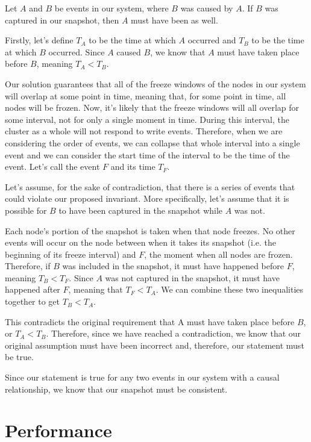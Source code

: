 Let $A$ and $B$ be events in our system, where $B$ was caused by
$A$. If $B$ was captured in our snapshot, then $A$ must have been as
well.

Firstly, let’s define $T_A$ to be the time at which $A$ occurred and
$T_B$ to be the time at which $B$ occurred. Since $A$ caused $B$, we know
that $A$ must have taken place before $B$, meaning $T_A < T_B$.

Our solution guarantees that all of the freeze windows of the nodes in
our system will overlap at some point in time, meaning that, for some
point in time, all nodes will be frozen. Now, it’s likely that the
freeze windows will all overlap for some interval, not for only a
single moment in time. During this interval, the cluster as a whole will not
respond to write events. Therefore, when we are considering the order
of events, we can collapse that whole interval into a single event and
we can consider the start time of the interval to be the time of the
event. Let’s call the event $F$ and its time $T_F$.

Let’s assume, for the sake of contradiction, that there is a series of
events that could violate our proposed invariant. More specifically,
let’s assume that it is possible for $B$ to have been captured in the
snapshot while $A$ was not.

Each node’s portion of the snapshot is taken when that node
freezes. No other events will occur on the node between when it takes
its snapshot (i.e. the beginning of its freeze interval) and $F$, the
moment when all nodes are frozen. Therefore, if $B$ was included in
the snapshot, it must have happened before $F$, meaning $T_B <
T_F$. Since $A$ was not captured in the snapshot, it must have
happened after $F$, meaning that $T_F < T_A$. We can combine these two
inequalities together to get $T_B < T_A$.

This contradicts the original requirement that A must have taken place
before $B$, or $T_A< T_B$. Therefore, since we have reached a
contradiction, we know that our original assumption must have been
incorrect and, therefore, our statement must be true.

Since our statement is true for any two events in our system with a
causal relationship, we know that our snapshot must be consistent.

\section{Performance}

